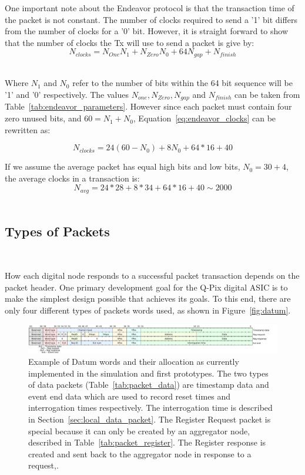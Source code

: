 One important note about the Endeavor protocol is that the transaction time of the packet is not constant.
The number of clocks required to send a '1' bit differs from the number of clocks for a '0' bit.
However, it is straight forward to show that the number of clocks the Tx will use to send a packet is give by:
\begin{equation}
  N_{clocks} = N_{One}N_{1} + N_{Zero}N_{0} + 64N_{gap} + N_{finish}
\end{equation}~\label{eq:endeavor_clocks}

Where $N_{1}$ and $N_{0}$ refer to the number of bits within the 64 bit sequence will be '1' and '0' respectively.
The values $N_{one}, N_{Zero}, N_{gap}$ and $N_{finish}$ can be taken from Table~\ref{tab:endeavor_parameters}.
However since each packet must contain four zero unused bits, and $60 = N_{1} + N_{0}$, Equation~\ref{eq:endeavor_clocks} can be rewritten as:

\begin{equation}
  N_{clocks} = 24(60 - N_{0}) + 8N_{0} + 64*16 + 40
\end{equation}

If we assume the average packet has equal high bits and low bits, $N_{0} = 30 + 4$, the average clocks in a transaction is:
\begin{equation}
  N_{avg} = 24*28 + 8*34 + 64*16 + 40 \sim 2000 
\end{equation}~\label{eq:avg_packet}


\subsection{Types of Packets}~\label{sec:digi_packets}

How each digital node responds to a successful packet transaction depends on the packet header.
One primary development goal for the Q-Pix digital ASIC is to make the simplest design possible that achieves its goals.
To this end, there are only four different types of packets words used, as shown in Figure~\ref{fig:datum}.

\begin{figure}[]
\centering
\includegraphics[width=\textwidth]{images/qpix_word_format.pdf}
\caption{Example of Datum words and their allocation as currently implemented in the simulation and first prototypes.
The two types of data packets (Table~\ref{tab:packet_data}) are timestamp data and event end data which are used to record reset times and interrogation times respectively.
The interrogation time is described in Section~\ref{sec:local_data_packet}.
The Register Request packet is special because it can only be created by an aggregator node, described in Table~\ref{tab:packet_register}. 
The Register response is created and sent back to the aggregator node in response to a request,.
}
\end{figure}~\label{fig:datum}

